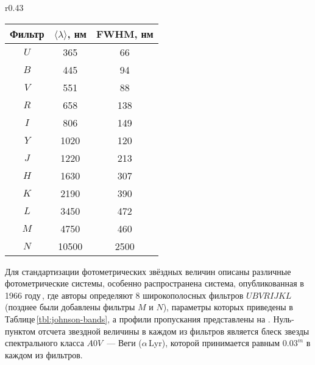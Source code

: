 \begin{wraptable}[15]{r}{0.43\tw}
    \vspace{-0.75pc}
    \footnotesize
    \centering
    \renewcommand{\arraystretch}{1.2}
    \begin{tabular}{|c|c|c|}
        \hline
        Фильтр & $\langle\lambda\rangle$, нм & FWHM, нм \\
        \hline
        $U$    & 365                         & 66       \\
        $B$    & 445                         & 94       \\
        $V$    & 551                         & 88       \\
        $R$    & 658                         & 138      \\
        $I$    & 806                         & 149      \\
        $Y$    & 1020                        & 120      \\
        $J$    & 1220                        & 213      \\
        $H$    & 1630                        & 307      \\
        $K$    & 2190                        & 390      \\
        $L$    & 3450                        & 472      \\
        $M$    & 4750                        & 460      \\
        $N$    & 10500                       & 2500     \\
        \hline
    \end{tabular}
    \caption{Параметры фильтров фотометрической системы Джонсона}
    \label{tbl:johnson-bands}
\end{wraptable}
Для стандартизации фотометрических звёздных величин описаны различные фотометрические системы, особенно распространена система, опубликованная в 1966 году\,\cite{johnson-photometry}, где авторы определяют 8 широкополосных фильтров $U\!BV\!RIJKL$ (позднее были добавлены фильтры $M$ и $N$), параметры которых приведены в Таблице\,\ref{tbl:johnson-bands}, а профили пропускания представлены на . Нуль-пунктом отсчета звездной величины в каждом из фильтров является блеск звезды спектрального класса $A0V$~--- Веги ($\alpha$\,Lyr), которой принимается равным $0.03^m$ в каждом из фильтров.

